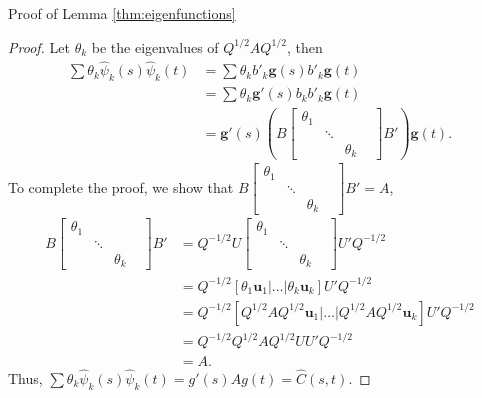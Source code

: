 Proof of Lemma \ref{thm:eigenfunctions} 
\begin{proof}
	Let $\theta_k$ be the eigenvalues of $Q^{1/2}AQ^{1/2}$, then 
	\begin{align*}
		\sum \theta_k \hat{\psi}_k(s)\hat{\psi}_k(t) &= \sum \theta_kb'_k\mathbf{g}(s)b'_k\mathbf{g}(t) \\
		&= \sum \theta_k\mathbf{g}'(s)b_kb'_k\mathbf{g}(t) \\
		&= \mathbf{g}'(s)\left( B 
		\begin{bmatrix}
			\theta_1 & & &\\
			& \ddots &\\
			& & \theta_k 
		\end{bmatrix}
		B' \right) \mathbf{g}(t). 
	\end{align*}
	To complete the proof, we show that $B 
	\begin{bmatrix}
		\theta_1 & & &\\
		& \ddots &\\
		& & \theta_k 
	\end{bmatrix}
	B'=A$, 
	\begin{align*}
		B 
		\begin{bmatrix}
			\theta_1 & & &\\
			& \ddots &\\
			& & \theta_k 
		\end{bmatrix}
		B' &= Q^{-1/2}U 
		\begin{bmatrix}
			\theta_1 & & &\\
			& \ddots &\\
			& & \theta_k 
		\end{bmatrix}
		U'Q^{-1/2}\\
		&= Q^{-1/2}[\theta_1\mathbf{u}_1| \dots |\theta_k\mathbf{u}_k] U'Q^{-1/2}\\
		&= Q^{-1/2}[Q^{1/2}AQ^{1/2}\mathbf{u}_1| \dots| Q^{1/2}AQ^{1/2}\mathbf{u}_k] U'Q^{-1/2}\\
		&= Q^{-1/2}Q^{1/2}AQ^{1/2}U U'Q^{-1/2}\\
		&= A. 
	\end{align*}
	Thus, $\sum \theta_k \hat{\psi}_k(s)\hat{\psi}_k(t) = g'(s)Ag(t) = \hat{C}(s,t)$. \qedhere 
\end{proof}

